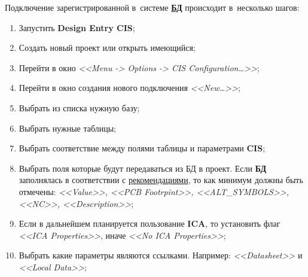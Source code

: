 Подключение зарегистрированной в~системе \hyperlink{sssec:bd_install}{\textbf{БД}} происходит в~несколько шагов:
\begin{enumerate}
	\item Запустить \textbf{Design Entry CIS};
	\item Создать новый проект или открыть имеющийся;
	\item Перейти в окно \textit{<<Menu -> Options -> CIS Configuration\ldots>>};
		\begin{figure}[H]
		\end{figure}
	\item Перейти в окно создания нового подключения \textit{<<New\ldots>>};
	\item Выбрать из списка нужную базу;
	\item \label{l:1} Выбрать нужные таблицы; 
		\begin{figure}[H]
		\end{figure}
	\item Выбрать соответствие между полями таблицы и параметрами \textbf{CIS};
		\begin{figure}[H]
		\end{figure}
		\begin{figure}[H]
		\end{figure}		
	\item Выбрать поля которые будут передаваться из БД в проект. Если \textbf{БД} заполнялась в соответствии с \hyperlink{sssec:bd_contet}{рекомендациями}, то как минимум должны быть отмечены: \textit{<<Value>>, <<PCB Footrpint>>, <<ALT\_SYMBOLS>>, <<NC>>, <<Description>>};
		\begin{figure}[H]
		\end{figure}
	\item Если в дальнейшем планируется пользование \textbf{ICA}, то установить флаг \textit{<<ICA Properties>>}, иначе \textit{<<No ICA Properties>>};
		\begin{figure}[H]
		\end{figure}
	\item Выбрать какие параметры являются ссылками. Например: \textit{<<Datasheet>>} и \textit{<<Local Data>>};

\end{enumerate}
